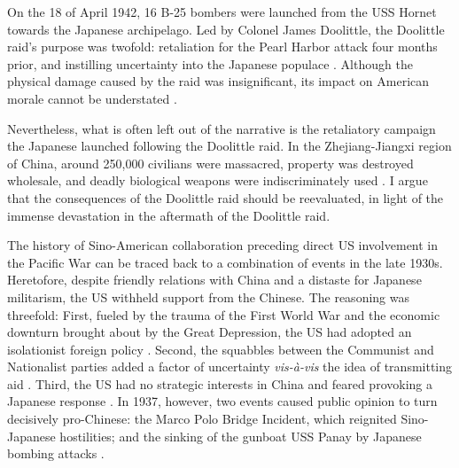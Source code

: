 
On the 18 of April 1942, 16 B-25 bombers were launched from the USS Hornet towards the Japanese archipelago. Led by Colonel James Doolittle, the Doolittle raid's purpose was twofold: retaliation for the Pearl Harbor attack four months prior, and instilling uncertainty into the Japanese populace \autocite[p.\ 10]{DoolittleGlines1995ICouldNeverBeSoLuckyAgain}. Although the physical damage caused by the raid was insignificant, its impact on American morale cannot be understated \autocite[chap.\ 18]{Scott2015TargetTokyo}.

Nevertheless, what is often left out of the narrative is the retaliatory campaign the Japanese launched following the Doolittle raid. In the Zhejiang-Jiangxi region of China, around 250,000 civilians were massacred, property was destroyed wholesale, and deadly biological weapons were indiscriminately used \autocite[p.\ 385]{PacificWarMuseum2024ChinaIncidentWarMedal}. I argue that the consequences of the Doolittle raid should be reevaluated, in light of the immense devastation in the aftermath of the Doolittle raid.

The history of Sino-American collaboration preceding direct US involvement in the Pacific War can be traced back to a combination of events in the late 1930s. Heretofore, despite friendly relations with China and a distaste for Japanese militarism, the US withheld support from the Chinese. The reasoning was threefold: First, fueled by the trauma of the First World War and the economic downturn brought about by the Great Depression, the US had adopted an isolationist foreign policy \autocite{StateHistorian2013AmericanIsolationism}. Second, the squabbles between the Communist and Nationalist parties added a factor of uncertainty \emph{vis-à-vis} the idea of transmitting aid \autocite{Doolittle1942GeneralReportJapaneseRaid}. Third, the US had no strategic interests in China and feared provoking a Japanese response \autocite[p.\ 69--70]{CannonEtAl2009IB20thCenturyWorldHistory}. In 1937, however, two events caused public opinion to turn decisively pro-Chinese: the Marco Polo Bridge Incident, which reignited Sino-Japanese hostilities; and the sinking of the gunboat USS Panay by Japanese bombing attacks \autocite[pp.\ 47--54]{WrightNelson1939AmericanAttitudes}. 

